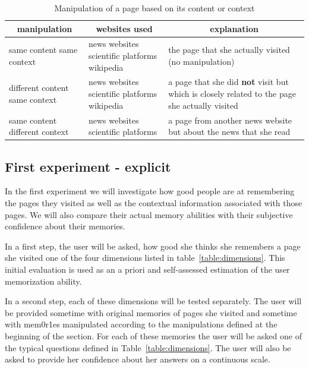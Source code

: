 \documentclass[10pt,a4paper]{article}
\begin{document}
\begin {table}[H]
\begin{center}
\begin{tabular}{|m{2.8cm}|m{3cm}|m{7cm}|}
\hline
\multicolumn{1}{|c|}{\textbf{manipulation}} &\multicolumn{1}{|c|}{\textbf{websites used}}&\multicolumn{1}{|c|}{\textbf{explanation}}\\
\hline
same content \newline same context & news websites \newline scientific platforms \newline wikipedia & the page that she actually visited (no manipulation) \\
\hline
different content \newline same context & news websites \newline scientific platforms \newline wikipedia & a page that she did \textbf{not} visit but which is closely related to the page she actually visited\\
\hline
same content \newline different context  & news websites \newline scientific platforms & a page from another news website but about the news that she read \\
\hline
\end{tabular}
\end{center}
	\caption{Manipulation of a page based on its content or context}
	\label{table:pageManipulation}
\end {table}


\subsection{First experiment - explicit}
In the first experiment we will investigate how good people are at remembering the pages they visited as well as the contextual information associated with those pages. We will also compare their actual memory abilities with their subjective confidence about their memories.

In a first step, the user will be asked, how good she thinks she remembers a page she visited one of the four dimensions listed in table~\ref{table:dimensions}. This initial evaluation is used as an a priori and self-assessed estimation of the user memorization ability.

In a second step, each of these dimensions will be tested separately. The user will be provided sometime with original memories of pages she visited and sometime with mem0r1es manipulated according to the manipulations defined at the beginning of the section. For each of these memories the user will be asked one of the typical questions defined in Table~\ref{table:dimensions}. The user will also be asked to provide her confidence about her answers on a continuous scale.
\end{document}
